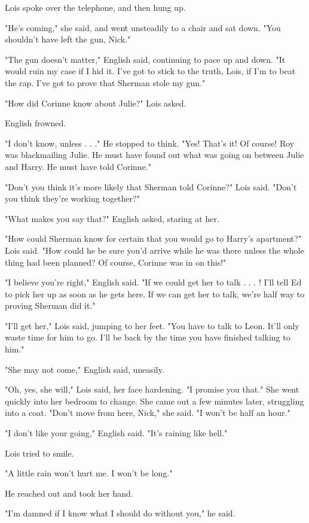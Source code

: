\documentclass{novel}
\begin{document}
Lois spoke over the telephone, and then hung up.

"He's coming," she said, and went unsteadily to a chair and sat down. "You shouldn't have left the gun, Nick."

"The gun doesn't matter," English said, continuing to pace up and down. "It would ruin my case if I hid it. I've got to stick to the truth, Lois, if I'm to beat the rap. I've got to prove that Sherman stole my gun."

"How did Corinne know about Julie?" Lois asked.

English frowned.

"I don't know, unless . . ." He stopped to think. "Yes! That's it! Of course! Roy was blackmailing Julie. He must have found out what was going on between Julie and Harry. He must have told Corinne."

"Don't you think it's more likely that Sherman told Corinne?" Lois said. "Don't you think they're working together?"

"What makes you say that?" English asked, staring at her.

"How could Sherman know for certain that you would go to Harry's apartment?" Lois said. "How could he be sure you'd arrive while he was there unless the whole thing had been planned? Of course, Corinne was in on this!"

"I believe you're right," English said. "If we could get her to talk . . . ! I'll tell Ed to pick her up as soon as he gets here. If we can get her to talk, we're half way to proving Sherman did it."

"I'll get her," Lois said, jumping to her feet. "You have to talk to Leon. It'll only waste time for him to go. I'll be back by the time you have finished talking to him."

"She may not come," English said, uneasily.

"Oh, yes, she will," Lois said, her face hardening. "I promise you that." She went quickly into her bedroom to change. She came out a few minutes later, struggling into a coat. "Don't move from here, Nick," she said. "I won't be half an hour."

"I don't like your going," English said. "It's raining like hell."

Lois tried to smile.

"A little rain won't hurt me. I won't be long."

He reached out and took her hand.

"I'm damned if I know what I should do without you," he said.
\end{document}
